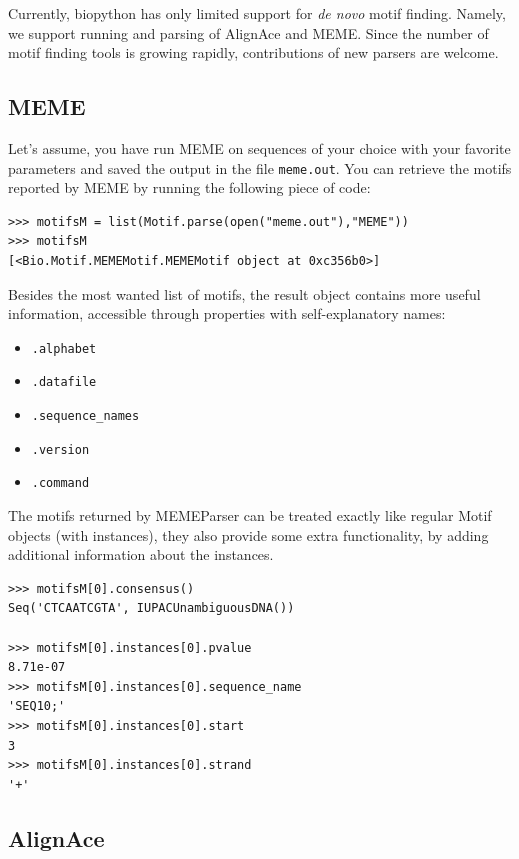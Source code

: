 \documentclass{report}
\begin{document}
Currently, biopython has only limited support for \emph{de novo} motif
finding. Namely, we support running and parsing of AlignAce and
MEME. Since the number of motif finding tools is growing rapidly, 
contributions of new parsers are welcome. 

\subsection{MEME}
\label{sec:meme}

Let's assume, you have run MEME on sequences of your choice with your
favorite parameters and saved the output in the file
\verb|meme.out|. You can retrieve the motifs reported by MEME by
running the following piece of code:

\begin{verbatim}
>>> motifsM = list(Motif.parse(open("meme.out"),"MEME"))
>>> motifsM
[<Bio.Motif.MEMEMotif.MEMEMotif object at 0xc356b0>]
\end{verbatim}

Besides the most wanted list of motifs, the result object contains more useful information, accessible through properties with self-explanatory names:
\begin{itemize}
\item \verb|.alphabet|
\item \verb|.datafile|
\item \verb|.sequence_names|
\item \verb|.version|
\item \verb|.command|
\end{itemize}

The motifs returned by MEMEParser can be treated exactly like regular
Motif objects (with instances), they also provide some extra
functionality, by adding additional information about the instances. 

\begin{verbatim}
>>> motifsM[0].consensus()
Seq('CTCAATCGTA', IUPACUnambiguousDNA())

>>> motifsM[0].instances[0].pvalue
8.71e-07
>>> motifsM[0].instances[0].sequence_name
'SEQ10;'
>>> motifsM[0].instances[0].start
3
>>> motifsM[0].instances[0].strand
'+'
\end{verbatim}


\subsection{AlignAce}
\label{sec:alignace}
\end{document}
